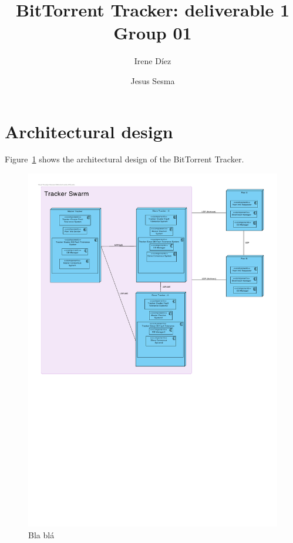 \documentclass[twoside,a4paper,10pt]{article}
\title{BitTorrent Tracker: deliverable 1\\
   Group 01}
\author{Irene Díez \and Jesus Sesma}
\begin{document}
\date{}
\maketitle


\section{Architectural design}

Figure~\ref{fig:arch} shows the architectural design of the BitTorrent Tracker.

\begin{figure}[h]
  \centering
  \includegraphics[width=\textwidth]{achitectural-design.pdf}
  \caption{\label{fig:arch}Bla blá}
\end{figure}
\end{document}
